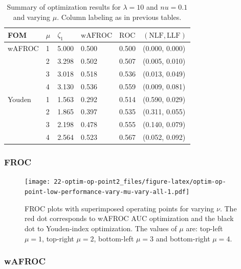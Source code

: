 \documentclass[
]{book}
\begin{document}
\begin{table}

\caption{\label{tab:optim-op-point-low-performance-vary-mu-table-vary-all}Summary of optimization results for $\lambda = 10$ and $nu = 0.1$ and varying $\mu$. Column labeling as in previous tables.}
\centering
\fontsize{10}{12}\selectfont
\begin{tabular}[t]{llllll}
\toprule
FOM & $\mu$ & $\zeta_1$ & $\text{wAFROC}$ & $\text{ROC}$ & $\left( \text{NLF}, \text{LLF}\right)$\\
\midrule
wAFROC & 1 & 5.000 & 0.500 & 0.500 & (0.000, 0.000)\\
 & 2 & 3.298 & 0.502 & 0.507 & (0.005, 0.010)\\
 & 3 & 3.018 & 0.518 & 0.536 & (0.013, 0.049)\\
 & 4 & 3.130 & 0.536 & 0.559 & (0.009, 0.081)\\
Youden & 1 & 1.563 & 0.292 & 0.514 & (0.590, 0.029)\\
\addlinespace
 & 2 & 1.865 & 0.397 & 0.535 & (0.311, 0.055)\\
 & 3 & 2.198 & 0.478 & 0.555 & (0.140, 0.079)\\
 & 4 & 2.564 & 0.523 & 0.567 & (0.052, 0.092)\\
\bottomrule
\end{tabular}
\end{table}

\hypertarget{froc-6}{%
\subsubsection{FROC}\label{froc-6}}

\begin{figure}
\centering
\texttt{[image: 22-optim-op-point2\_files/figure-latex/optim-op-point-low-performance-vary-mu-vary-all-1.pdf]}
\caption{\label{fig:optim-op-point-low-performance-vary-mu-vary-all}FROC plots with superimposed operating points for varying \(\nu\). The red dot corresponds to wAFROC AUC optimization and the black dot to Youden-index optimization. The values of \(\mu\) are: top-left \(\mu = 1\), top-right \(\mu = 2\), bottom-left \(\mu = 3\) and bottom-right \(\mu = 4\).}
\end{figure}

\hypertarget{wafroc-6}{%
\subsubsection{wAFROC}\label{wafroc-6}}
\end{document}
